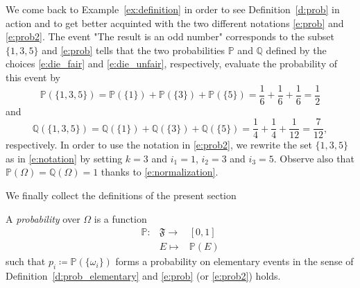 	    \begin{example}
		    \label{ex:dice_prob}
			We come back to Example~\ref{ex:definition} in order to see Definition~\ref{d:prob} in action and to get better acquinted with the two different notations \eqref{e:prob} and \eqref{e:prob2}.  The event "The result is an odd number" corresponds to the subset  $\{1,3,5\}$ and \eqref{e:prob} tells that the two probabilities $\mathbb P$ and $\mathbb Q$ defined by the choices \eqref{e:die_fair} and \eqref{e:die_unfair}, respectively, evaluate the probability of this event by  
			\begin{equation}
				\label{e:die_prob_uni}
				\mathbb P (\{1,3,5\}) = \mathbb P(\{1\}) + \mathbb P(\{3\}) + \mathbb P(\{5\}) = \frac16 + \frac16 + \frac16 = \frac12
			\end{equation}
	and
			\begin{equation}
				\label{e:die_prob_unfair}
				\mathbb Q (\{1,3,5\}) = \mathbb Q(\{1\}) + \mathbb Q(\{3\}) + \mathbb Q(\{5\}) = \frac14 + \frac14 + \frac1{12} = \frac7{12},
		   \end{equation}
	respectively. In order to use the notation in \eqref{e:prob2}, we rewrite the set $\{1,3,5\}$ as in \eqref{e:notation} by setting  $k = 3$ and $i_1 = 1$, $i_2 = 3$ and $i_3 = 5$. Observe also that $\mathbb P(\Omega) = \mathbb Q(\Omega) = 1$ thanks to \eqref{e:normalization}.
		\end{example}

		We finally collect the definitions of the present section 
		\begin{definition}
			\label{d:prob3}
			A \emph{probability} over $\Omega$ is a function 
			\begin{equation}
				\begin{array}{ccc}
					\mathbb P: & \mathfrak F \to & [0,1]\\
					& E  \mapsto & \mathbb P(E)
				\end{array}
			\end{equation}
			such that $p_i \coloneq \mathbb P(\{\omega_i\})$ forms a probability on elementary events in the sense of Definition~\ref{d:prob_elementary} and \eqref{e:prob} (or \eqref{e:prob2}) holds.
		\end{definition}
	
	

